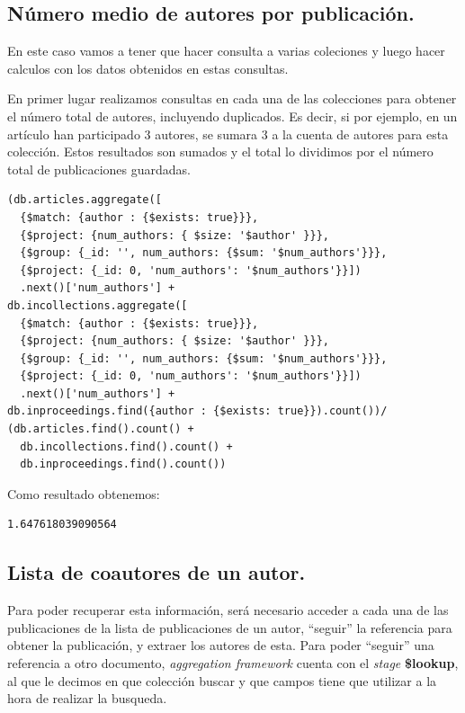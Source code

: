 \subsection{Número medio de autores por publicación.}

En este caso vamos a tener que hacer consulta a varias coleciones y luego hacer calculos con los datos obtenidos en estas consultas.

En primer lugar realizamos consultas en cada una de las colecciones para obtener el número total de autores, incluyendo duplicados. Es decir, si por ejemplo, en un artículo han participado 3 autores, se sumara 3 a la cuenta de autores para esta colección. Estos resultados son sumados y el total lo dividimos por el número total de publicaciones guardadas.

\begin{verbatim}
(db.articles.aggregate([
  {$match: {author : {$exists: true}}}, 
  {$project: {num_authors: { $size: '$author' }}}, 
  {$group: {_id: '', num_authors: {$sum: '$num_authors'}}}, 
  {$project: {_id: 0, 'num_authors': '$num_authors'}}])
  .next()['num_authors'] +
db.incollections.aggregate([
  {$match: {author : {$exists: true}}}, 
  {$project: {num_authors: { $size: '$author' }}}, 
  {$group: {_id: '', num_authors: {$sum: '$num_authors'}}}, 
  {$project: {_id: 0, 'num_authors': '$num_authors'}}])
  .next()['num_authors'] +
db.inproceedings.find({author : {$exists: true}}).count())/
(db.articles.find().count() + 
  db.incollections.find().count() + 
  db.inproceedings.find().count())
\end{verbatim}

Como resultado obtenemos:

\begin{verbatim}
1.647618039090564
\end{verbatim}

\subsection{Lista de coautores de un autor.}

Para poder recuperar esta información, será necesario acceder a cada una de las publicaciones de la lista de publicaciones de un autor, ``seguir'' la referencia para obtener la publicación, y extraer los autores de esta. Para poder ``seguir'' una referencia a otro documento, \textit{aggregation framework} cuenta con el \textit{stage} \textbf{\$lookup}, al que le decimos en que colección buscar y que campos tiene que utilizar a la hora de realizar la busqueda.

